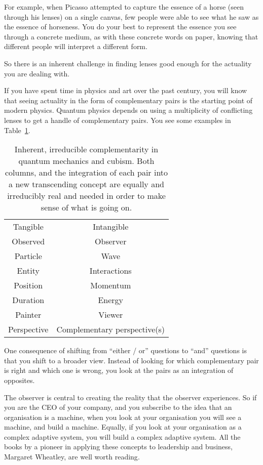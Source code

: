 For example, when Picasso attempted to capture the essence of a horse (seen through his lenses) on a single canvas, few people were able to see what he saw as the essence of horseness. You do your best to represent the essence you see through a concrete medium, as with these concrete words on paper, knowing that different people will interpret a different form. 


So there is an inherent challenge in finding lenses good enough for the actuality you are dealing with. 


If you have spent time in physics and art over the past century, you will know that seeing actuality in the form of complementary pairs is the starting point of modern physics. Quantum physics depends on using a multiplicity of conflicting lenses to get a handle of complementary pairs. You see some examples in Table~\ref{table:complementary-pairs}. 




\begin{table}[htbp]
\centering
\begin{tabular}{ c  c  }
\toprule
Tangible & Intangible \\
Observed & Observer \\
Particle & Wave \\
Entity & Interactions \\ 
Position & Momentum \\
Duration & Energy \\
Painter & Viewer \\
Perspective & Complementary perspective(s) \\
\bottomrule
\end{tabular}
\caption[Complementarity in quantum mechanics and cubism]{Inherent, irreducible complementarity in quantum mechanics and cubism. Both columns, and the integration of each pair into a new transcending concept are equally and irreducibly real and needed in order to make sense of what is going on.}
\label{table:complementary-pairs}
\end{table}


One consequence of shifting from “either / or” questions to “and” questions is that you shift to a broader view. Instead of looking for which complementary pair is right and which one is wrong, you look at the pairs as an integration of opposites. 


The observer is central to creating the reality that the observer experiences. So if you are the CEO of your company, and you subscribe to the idea that an organisation is a machine, when you look at your organisation you will see a machine, and build a machine. Equally, if you look at your organisation as a complex adaptive system, you will build a complex adaptive system. All the books by a pioneer in applying these concepts to leadership and business, Margaret Wheatley, are well worth reading\cite{wheatley-leadership,wheatley-lost-found}.


